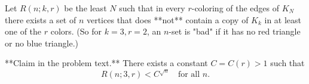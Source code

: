 Let $R(n;k,r)$ be the least $N$ such that in every $r$-coloring of the edges of $K_N$ there exists a set of $n$ vertices that does **not** contain a copy of $K_k$ in at least one of the $r$ colors.
(So for $k=3,r=2$, an $n$-set is "bad" if it has no red triangle or no blue triangle.)

**Claim in the problem text.** There exists a constant $C=C(r)>1$ such that
\[
R(n;3,r) < C^{\sqrt{n}}\quad\text{for all }n.
\]
